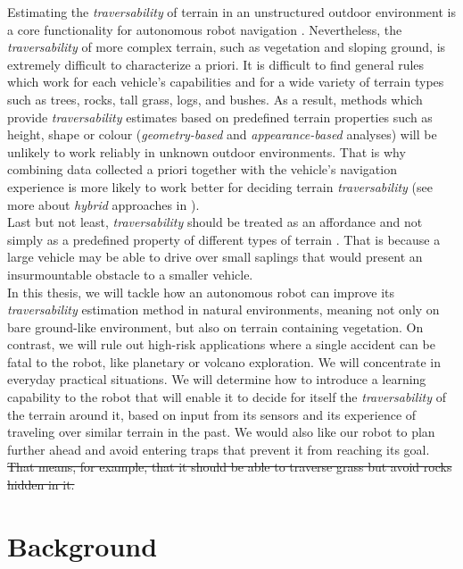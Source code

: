 \documentclass[12pt,a4paper]{report}
\newcommand{\term}{\textit}
\begin{document}
	Estimating the \term{traversability} of terrain in an unstructured outdoor 
	environment is a core functionality for autonomous robot navigation \cite{Kim}. 
	Nevertheless, the \term{traversability} of more complex terrain, such as 
	vegetation and sloping ground, is extremely difficult to characterize a priori. 
	It is difficult to find general rules which work for each vehicle's	capabilities
	and for a wide variety of terrain types such as trees, rocks, tall grass, logs, 
	and bushes. As a result, methods which provide \term{traversability} estimates 
	based on predefined terrain properties such as height, shape or colour 
	(\term{geometry-based} and \term{appearance-based} analyses) will be unlikely to 
	work reliably in unknown outdoor environments. That is why combining data 
	collected a priori together with the vehicle’s navigation experience is more 
	likely to work better for deciding terrain \term{traversability} (see more about 
	\term{hybrid} approaches in \cite{Papadakis}).
	\\
	
	Last but not least, \term{traversability} should be treated as an affordance and 
	not simply as a predefined property of different types of terrain \cite{Kim}. 
	That is because a large vehicle may be able to drive over small saplings that 
	would present an insurmountable obstacle to a smaller vehicle.
	\\
	
	In this thesis, we will tackle how an autonomous robot can improve its 
	\term{traversability} estimation method in natural environments, meaning not 
	only on bare ground-like environment, but also on terrain containing vegetation. 
	On contrast, we will rule out high-risk applications where a single accident can 
	be fatal to the robot, like planetary or volcano exploration. We will concentrate 
	in everyday practical situations. We will determine how to introduce a learning 
	capability to the robot that will enable it to decide for itself the 
	\term{traversability} of the terrain around it, based on input from its sensors 
	and its experience of traveling over similar terrain in the past. We would also 
	like our robot to plan further ahead	and avoid entering traps that prevent it 
	from reaching its goal.
	\\
	
	\sout{That means, for example, that it should be able to traverse grass but avoid 
	rocks hidden in it.}
	
	\chapter{Background}
	\label{sec:bg}
	
\end{document}
